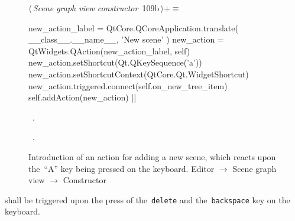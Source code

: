 \documentclass[%
    a4paper,    %
    justified,  %
    nobib,      %
    openany     %
]{tufte-book}
\makeatletter
\renewcommand{\label}[1]{\@tufte@label{##1}}%
\makeatother
\begin{document}
\begin{figure}[!htbp]
\begin{flushleft} \small
\begin{minipage}{\linewidth}\label{scrap46}\raggedright\small
{} $\langle\,${\itshape Scene graph view constructor}\nobreak\ {\footnotesize {109b}}$\,\rangle+\equiv$
\vspace{-1ex}
\begin{pythoncode}
    new_action_label = QtCore.QCoreApplication.translate(
        __class__.__name__, 'New scene'
    )
    new_action = QtWidgets.QAction(new_action_label, self)
    new_action.setShortcut(Qt.QKeySequence('a'))
    new_action.setShortcutContext(QtCore.Qt.WidgetShortcut)
    new_action.triggered.connect(self.on_new_tree_item)
    self.addAction(new_action)
|\NWsep|
\end{pythoncode}
\vspace{1.5ex}
\footnotesize
\begin{list}{}{\setlength{\itemsep}{-\parsep}\setlength{\itemindent}{-\leftmargin}}
\item \NWtxtMacroDefBy\ .
\item \NWtxtMacroRefIn\ .

\item{}
\end{list}
\end{minipage}\vspace{4ex}
\end{flushleft}
\caption{Introduction of an action for adding a new scene, which reacts upon
  the~\enquote{A} key being pressed on the keyboard.
  \newline{}\newline{}Editor $\rightarrow$ Scene graph view
  $\rightarrow$ Constructor}
\end{figure}

 shall be triggered upon the press of
the~\verb=delete= and the~\verb=backspace= key on the keyboard.
\end{document}
